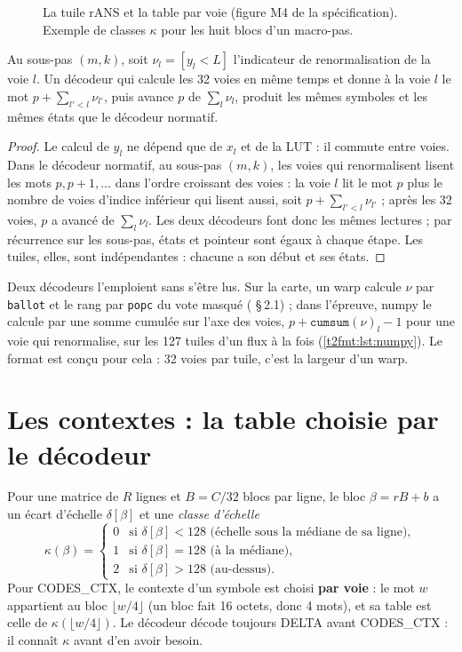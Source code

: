 \begin{figure}[ht]
\centering
\TdFmtTuile
\caption[La tuile rANS et la table par voie]{La tuile rANS et la table par voie (figure M4 de la spécification). Exemple de classes $\kappa$ pour les huit blocs d'un macro-pas.}
\label{t2fmt:fig:tuile}
\end{figure}

\begin{proposition}\label{t2fmt:prop:parallele}
Au sous-pas $(m, k)$, soit $\nu_l = [y_l < L]$ l'indicateur de renormalisation de la voie $l$. Un décodeur qui calcule les 32 voies en même temps et donne à la voie $l$ le mot $p + \sum_{l' < l} \nu_{l'}$, puis avance $p$ de $\sum_l \nu_l$, produit les mêmes symboles et les mêmes états que le décodeur normatif.
\end{proposition}
\begin{proof}
Le calcul de $y_l$ ne dépend que de $x_l$ et de la LUT : il commute entre voies. Dans le décodeur normatif, au sous-pas $(m, k)$, les voies qui renormalisent lisent les mots $p, p+1, \dots$ dans l'ordre croissant des voies : la voie $l$ lit le mot $p$ plus le nombre de voies d'indice inférieur qui lisent aussi, soit $p + \sum_{l'<l} \nu_{l'}$ ; après les 32 voies, $p$ a avancé de $\sum_l \nu_l$. Les deux décodeurs font donc les mêmes lectures ; par récurrence sur les sous-pas, états et pointeur sont égaux à chaque étape. Les tuiles, elles, sont indépendantes : chacune a son début et ses états.
\end{proof}

Deux décodeurs l'emploient sans s'être lus. Sur la carte, un warp calcule $\nu$ par \texttt{ballot} et le rang par \texttt{popc} du vote masqué ( §\,2.1) ; dans l'épreuve, numpy le calcule par une somme cumulée sur l'axe des voies, $p + \texttt{cumsum}(\nu)_l - 1$ pour une voie qui renormalise, sur les 127 tuiles d'un flux à la fois (\cref{t2fmt:lst:numpy}). Le format est conçu pour cela : 32 voies par tuile, c'est la largeur d'un warp.

\section{Les contextes : la table choisie par le décodeur}\label{t2fmt:sec:contextes}

Pour une matrice de $R$ lignes et $B = C/32$ blocs par ligne, le bloc $\beta = rB + b$ a un écart d'échelle $\delta[\beta]$ et une \emph{classe d'échelle}
\[
\kappa(\beta) = \begin{cases} 0 & \text{si } \delta[\beta] < 128 \text{ (échelle sous la médiane de sa ligne)},\\ 1 & \text{si } \delta[\beta] = 128 \text{ (à la médiane)},\\ 2 & \text{si } \delta[\beta] > 128 \text{ (au-dessus)}. \end{cases}
\]
Pour CODES\_CTX, le contexte d'un symbole est choisi \textbf{par voie} : le mot $w$ appartient au bloc $\lfloor w/4 \rfloor$ (un bloc fait 16 octets, donc 4 mots), et sa table est celle de $\kappa(\lfloor w/4 \rfloor)$. Le décodeur décode toujours DELTA avant CODES\_CTX : il connaît $\kappa$ avant d'en avoir besoin.

